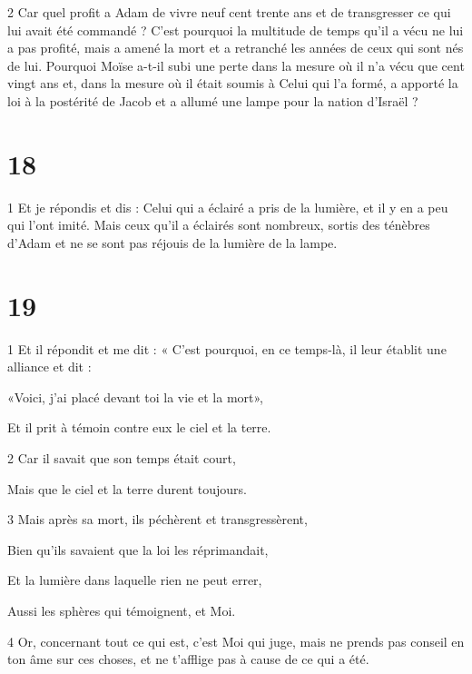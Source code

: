 \par 2 Car quel profit a Adam de vivre neuf cent trente ans et de transgresser ce qui lui avait été commandé ? C'est pourquoi la multitude de temps qu'il a vécu ne lui a pas profité, mais a amené la mort et a retranché les années de ceux qui sont nés de lui. Pourquoi Moïse a-t-il subi une perte dans la mesure où il n'a vécu que cent vingt ans et, dans la mesure où il était soumis à Celui qui l'a formé, a apporté la loi à la postérité de Jacob et a allumé une lampe pour la nation d'Israël ?

\chapter{18}

\par 1 Et je répondis et dis : Celui qui a éclairé a pris de la lumière, et il y en a peu qui l'ont imité. Mais ceux qu'il a éclairés sont nombreux, sortis des ténèbres d'Adam et ne se sont pas réjouis de la lumière de la lampe.

\chapter{19}

\par 1 Et il répondit et me dit : « C'est pourquoi, en ce temps-là, il leur établit une alliance et dit :

\par «Voici, j'ai placé devant toi la vie et la mort»,

\par Et il prit à témoin contre eux le ciel et la terre.

\par 2 Car il savait que son temps était court,

\par Mais que le ciel et la terre durent toujours.

\par 3 Mais après sa mort, ils péchèrent et transgressèrent,

\par Bien qu'ils savaient que la loi les réprimandait,

\par Et la lumière dans laquelle rien ne peut errer,

\par Aussi les sphères qui témoignent, et Moi.

\par 4 Or, concernant tout ce qui est, c'est Moi qui juge, mais ne prends pas conseil en ton âme sur ces choses, et ne t'afflige pas à cause de ce qui a été.

